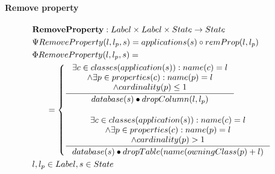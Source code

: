 \documentclass[11pt]{article}
\begin{document}
\paragraph{Remove property}
\begin{align*}
&	\mathbf{RemoveProperty} : Label \times Label \times State \rightarrow State \\
&	\Psi RemoveProperty(l, l_p, s) =  applications(s) \circ  remProp(l, l_p) \\
&	\Phi RemoveProperty(l, l_p, s) = \\
& \;\;\;\;\;\; =\begin{cases}
		 \inference{\exists c \in classes(application(s)) : name(c) = l\\ 
		\wedge \exists p \in properties(c) : name(p) = l \\ \wedge cardinality(p) \leq 1}{database(s) \bullet dropColumn(l, l_p)}  \\\\
		 \inference{\exists c \in classes(application(s)) : name(c) = l\\ 
		\wedge \exists p \in properties(c)  : name(p) = l \\ \wedge cardinality(p)>1}{database(s) \bullet dropTable(name(owningClass(p)+l)}
 	\end{cases}\\
&	l, l_p \in Label, s \in State
\end{align*}
\end{document}
